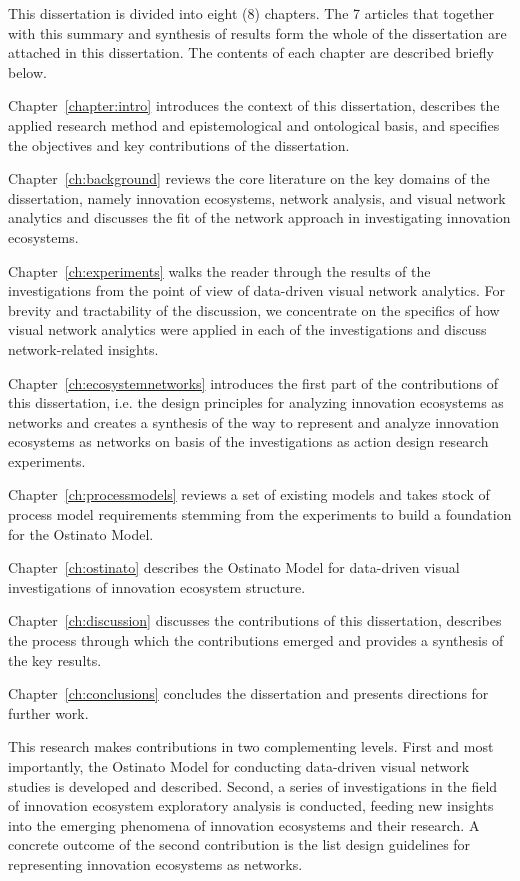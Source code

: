 This dissertation is divided into eight (8) chapters. The 7 articles that together with this summary and synthesis of results form the whole of the dissertation are attached in this dissertation. The contents of each chapter are described briefly below.

Chapter~\ref{chapter:intro} introduces the context of this dissertation, describes the applied research method and epistemological and ontological basis, and specifies the objectives and key contributions of the dissertation.

Chapter~\ref{ch:background} reviews the core literature on the key domains of the dissertation, namely innovation ecosystems, network analysis, and visual network analytics and discusses the fit of the network approach in investigating innovation ecosystems.

Chapter~\ref{ch:experiments} walks the reader through the results of the investigations from the point of view of data-driven visual network analytics. For brevity and tractability of the discussion, we concentrate on the specifics of how visual network analytics were applied in each of the investigations and discuss network-related insights. 

Chapter~\ref{ch:ecosystemnetworks} introduces the first part of the contributions of this dissertation, i.e. the design principles for analyzing innovation ecosystems as networks and creates a synthesis of the way to represent and analyze innovation ecosystems as networks on basis of the investigations as action design research experiments.

Chapter~\ref{ch:processmodels} reviews a set of existing models and takes stock of process model requirements stemming from the experiments to build a foundation for the Ostinato Model. 

Chapter~\ref{ch:ostinato} describes the Ostinato Model for data-driven visual investigations of innovation ecosystem structure.

Chapter~\ref{ch:discussion} discusses the contributions of this dissertation, describes the process through which the contributions emerged and provides a synthesis of the key results.

Chapter~\ref{ch:conclusions} concludes the dissertation and presents directions for further work.
 
This research makes contributions in two complementing levels. First and most importantly, the Ostinato Model for conducting data-driven visual network studies is developed and described. Second, a series of investigations in the field of innovation ecosystem exploratory analysis is conducted, feeding new insights into the emerging phenomena of innovation ecosystems and their research. A concrete outcome of the second contribution is the list design guidelines for representing innovation ecosystems as networks.

